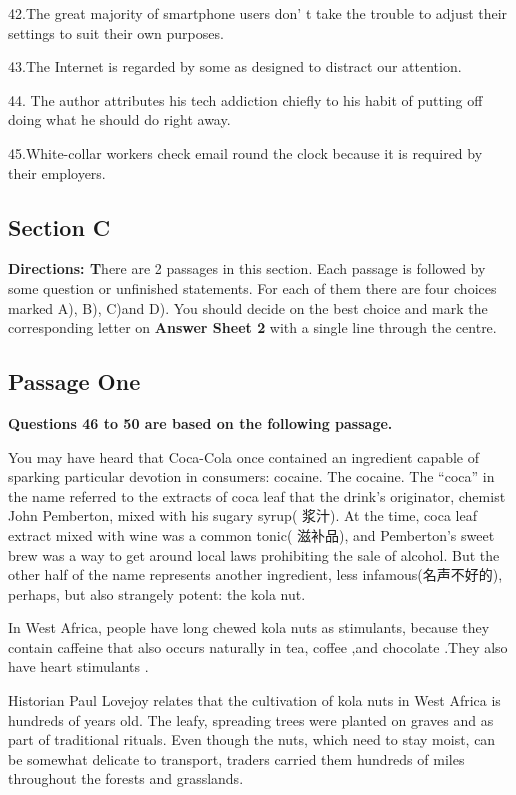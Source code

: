 \documentclass[UTF8,11pt]{ctexart}
\begin{document}
42.The great majority of smartphone users don' t take the trouble to adjust their settings to suit their own purposes.


43.The Internet is regarded by some as designed to distract our attention.


44. The author attributes his tech addiction chiefly to his habit of putting off doing what he should do right away.


45.White-collar workers check email round the clock because it is required by their employers.


\subsection*{\textbf{Section C}}


\textbf{Directions: T}here are 2 passages in this section. Each passage is followed by some question or unfinished statements. For each of them there are four choices marked A), B), C)and D). You should decide on the best choice and mark the corresponding letter on\textbf{ Answer Sheet 2} with a single line through the centre.


\subsection*{\textbf{Passage One}}


\textbf{Questions 46 to 50 are based on the following passage.}


You may have heard that Coca-Cola once contained an ingredient capable of sparking particular devotion in consumers: cocaine. The cocaine. The “coca” in the name referred to the extracts of coca leaf that the drink's originator, chemist John Pemberton, mixed with his sugary syrup( 浆汁). At the time, coca leaf extract mixed with wine was a common tonic( 滋补品), and Pemberton's sweet brew was a way to get around local laws prohibiting the sale of alcohol. But the other half of the name represents another ingredient, less infamous(名声不好的), perhaps, but also strangely potent: the kola nut.


In West Africa, people have long chewed kola nuts as stimulants, because they contain caffeine that also occurs naturally in tea, coffee ,and chocolate .They also have heart stimulants .


Historian Paul Lovejoy relates that the cultivation of kola nuts in West Africa is hundreds of years old. The leafy, spreading trees were planted on graves and as part of traditional rituals. Even though the nuts, which need to stay moist, can be somewhat delicate to transport, traders carried them hundreds of miles throughout the forests and grasslands.
\end{document}
